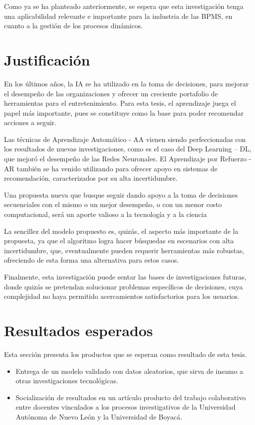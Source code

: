 Como ya se ha planteado anteriormente, se espera que esta investigación tenga una aplicabilidad relevante e importante para la industria de las BPMS, en cuanto a la gestión de los procesos dinámicos.

\section{Justificación}

En los últimos años, la IA se ha utilizado en la toma de decisiones, para mejorar el desempeño de las organizaciones y ofrecer un creciente portafolio de herramientas para el entretenimiento. Para esta tesis, el aprendizaje juega el papel más importante, pues se constituye como la base para poder recomendar acciones a seguir.

Las técnicas de Aprendizaje Automático - AA vienen siendo perfeccionadas con los resultados de nuevas investigaciones, como es el caso del Deep Learning – DL, que mejoró el desempeño de las Redes Neuronales. El Aprendizaje por Refuerzo - AR también se ha venido utilizando para ofrecer apoyo en sistemas de recomendación, caracterizados por su alta incertidumbre. 

Una propuesta nueva que busque seguir dando apoyo a la toma de decisiones secuenciales con el mismo o un mejor desempeño, o con un menor costo computacional, será un aporte valioso a la tecnología y a la ciencia

La sencillez del modelo propuesto es, quizás, el aspecto más importante de la propuesta, ya que el algoritmo logra hacer búsquedas en escenarios con alta incertidumbre, que, eventualmente pueden requerir herramientas más robustas, ofreciendo de esta forma una alternativa para estos casos.

Finalmente, esta investigación puede sentar las bases de investigaciones futuras, donde quizás se pretendan solucionar problemas específicos de decisiones, cuya complejidad no haya permitido acercamientos satisfactorios para los usuarios.


\section{Resultados esperados}
Esta sección presenta los productos que se esperan como resultado de esta tesis.

\begin{itemize}
\item Entrega de un modelo validado con datos aleatorios, que sirva de insumo a otras investigaciones tecnológicas.

\item Socialización de resultados en un artículo producto del trabajo colaborativo entre docentes vinculados a los procesos investigativos de la Universidad Autónoma de Nuevo León y la Universidad de Boyacá.
\end{itemize}

